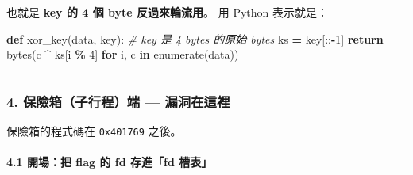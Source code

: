 \documentclass[10pt,a4paper]{article}
\newenvironment{Shaded}{\begin{snugshade}}{\end{snugshade}}
\newcommand{\BuiltInTok}[1]{#1}
\newcommand{\CommentTok}[1]{\textcolor[rgb]{0.56,0.35,0.01}{\textit{#1}}}
\newcommand{\ControlFlowTok}[1]{\textcolor[rgb]{0.13,0.29,0.53}{\textbf{#1}}}
\newcommand{\DecValTok}[1]{\textcolor[rgb]{0.00,0.00,0.81}{#1}}
\newcommand{\KeywordTok}[1]{\textcolor[rgb]{0.13,0.29,0.53}{\textbf{#1}}}
\newcommand{\NormalTok}[1]{#1}
\newcommand{\OperatorTok}[1]{\textcolor[rgb]{0.81,0.36,0.00}{\textbf{#1}}}
\renewenvironment{Shaded}{%
  \def\FrameCommand{\fboxsep=3.2pt\colorbox{shadecolor}}%
  \MakeFramed{\advance\hsize-\width\FrameRestore\small}%
}{%
  \endMakeFramed
}
\begin{document}
也就是 \textbf{key 的 4 個 byte 反過來輪流用}。 用 Python 表示就是：

\begin{Shaded}
\begin{Highlighting}[]
\KeywordTok{def}\NormalTok{ xor\_key(data, key):          }\CommentTok{\# key 是 4 bytes 的原始 bytes}
\NormalTok{    ks }\OperatorTok{=}\NormalTok{ key[::}\OperatorTok{{-}}\DecValTok{1}\NormalTok{]}
    \ControlFlowTok{return} \BuiltInTok{bytes}\NormalTok{(c }\OperatorTok{\^{}}\NormalTok{ ks[i }\OperatorTok{\%} \DecValTok{4}\NormalTok{] }\ControlFlowTok{for}\NormalTok{ i, c }\KeywordTok{in} \BuiltInTok{enumerate}\NormalTok{(data))}
\end{Highlighting}
\end{Shaded}

\begin{center}\rule{0.5\linewidth}{0.5pt}\end{center}

\subsubsection{4. 保險箱（子行程）端 ---
漏洞在這裡}\label{ux4fddux96aaux7bb1ux5b50ux884cux7a0bux7aef-ux6f0fux6d1eux5728ux9019ux88e1}

保險箱的程式碼在 \texttt{0x401769} 之後。

\paragraph{4.1 開場：把 flag 的 fd 存進「fd
槽表」}\label{ux958bux5834ux628a-flag-ux7684-fd-ux5b58ux9032fd-ux69fdux8868}
\end{document}
